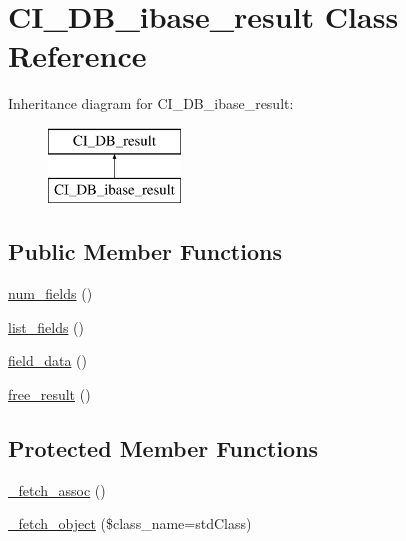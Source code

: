 \hypertarget{class_c_i___d_b__ibase__result}{}\section{C\+I\+\_\+\+D\+B\+\_\+ibase\+\_\+result Class Reference}
\label{class_c_i___d_b__ibase__result}
Inheritance diagram for C\+I\+\_\+\+D\+B\+\_\+ibase\+\_\+result\+:\begin{figure}[H]
\begin{center}
\leavevmode
\includegraphics[height=2.000000cm]{class_c_i___d_b__ibase__result}
\end{center}
\end{figure}
\subsection*{Public Member Functions}
\begin{DoxyCompactItemize}
\item 
\mbox{\hyperlink{class_c_i___d_b__ibase__result_af831bf363e4d7d661a717a4932af449d}{num\+\_\+fields}} ()
\item 
\mbox{\hyperlink{class_c_i___d_b__ibase__result_a50b54eb4ea7cfd039740f532988ea776}{list\+\_\+fields}} ()
\item 
\mbox{\hyperlink{class_c_i___d_b__ibase__result_a84bffd65e53902ade1591716749a33e3}{field\+\_\+data}} ()
\item 
\mbox{\hyperlink{class_c_i___d_b__ibase__result_aad2d98d6beb3d6095405356c6107b473}{free\+\_\+result}} ()
\end{DoxyCompactItemize}
\subsection*{Protected Member Functions}
\begin{DoxyCompactItemize}
\item 
\mbox{\hyperlink{class_c_i___d_b__ibase__result_a43a9a92817f1334a1c10752ec44275a0}{\+\_\+fetch\+\_\+assoc}} ()
\item 
\mbox{\hyperlink{class_c_i___d_b__ibase__result_a60806be6a9c2488820813c2a7f4fef71}{\+\_\+fetch\+\_\+object}} (\$class\+\_\+name=\textquotesingle{}std\+Class\textquotesingle{})
\end{DoxyCompactItemize}
